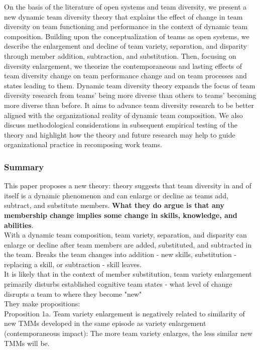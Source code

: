 \documentclass[12pt]{article}
\begin{document}
On the basis of the literature of open systems and team diversity, we present a new dynamic team diversity theory that explains the effect of change in team diversity on team functioning and performance in the context of dynamic team composition. Building upon the conceptualization of teams as open systems, we describe the enlargement and decline of team variety, separation, and disparity through member addition, subtraction, and substitution. Then, focusing on diversity enlargement, we theorize the contemporaneous and lasting effects of team diversity change on team performance change and on team processes and states leading to them. Dynamic team diversity theory expands the focus of team diversity research from teams' being more diverse than others to teams' becoming more diverse than before. It aims to advance team diversity research to be better aligned with the organizational reality of dynamic team composition. We also discuss methodological considerations in subsequent empirical testing of the theory and highlight how the theory and future research may help to guide organizational practice in recomposing work teams.

\subsubsection*{Summary}

This paper proposes a new theory: theory suggests that team diversity in and of itself is a dynamic phenomenon and can enlarge or decline as teams add, subtract, and substitute members. \textbf{What they do argue is that any membership change implies some change in skills, knowledge, and abilities}. \\

With a dynamic team composition, team variety, separation, and disparity can enlarge or decline after team members are added, substituted, and subtracted in the team. Breaks the team changes into addition - new skills, substitution - replacing a skill, or subtraction - skill leaves. \\

It is likely that in the context of member substitution, team variety enlargement primarily disturbs established cognitive team states - what level of change disrupts a team to where they become "new" \\

They make propositions: \\

Proposition 1a. Team variety enlargement is negatively related to similarity of new TMMs developed in the same episode as variety enlargement (contemporaneous impact): The more team variety enlarges, the less similar new TMMs will be. \\
\end{document}
